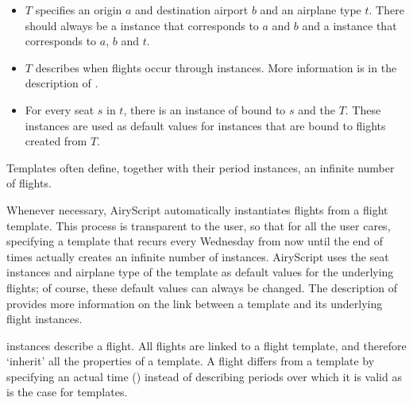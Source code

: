 \begin{description}
    \begin{itemize}
      \item $T$ specifies an origin $a$ and destination airport $b$ and an
        airplane type $t$. There should always be a  instance that
        corresponds to $a$ and $b$ and a  instance that
        corresponds to $a$, $b$ and $t$.
      \item $T$ describes when flights occur through 
        instances. More information is in the description of .
      \item For every seat $s$ in $t$, there is an instance of
         bound to $s$ and the $T$. These instances are
        used as default values for  instances that are bound
        to flights created from $T$.
    \end{itemize}
    
    Templates often define, together with their period instances, an infinite
    number of flights.

    Whenever necessary, AiryScript automatically instantiates flights from a
    flight template. This process is transparent to the user, so that for all
    the user cares, specifying a template that recurs every Wednesday from now
    until the end of times actually creates an infinite number of 
    instances. AiryScript uses the seat instances and airplane type of the
    template as default values for the underlying flights; of course, these
    default values can always be changed. The description of 
    provides more information on the link between a template and its underlying
    flight instances.

  \item[\dbf{Flight}] instances describe a flight. All flights are linked to a
    flight template, and therefore ‘inherit’ all the properties of a template. A
    flight differs from a template by specifying an actual time ()
    instead of describing periods over which it is valid as is the case for
    templates.


\end{description}
